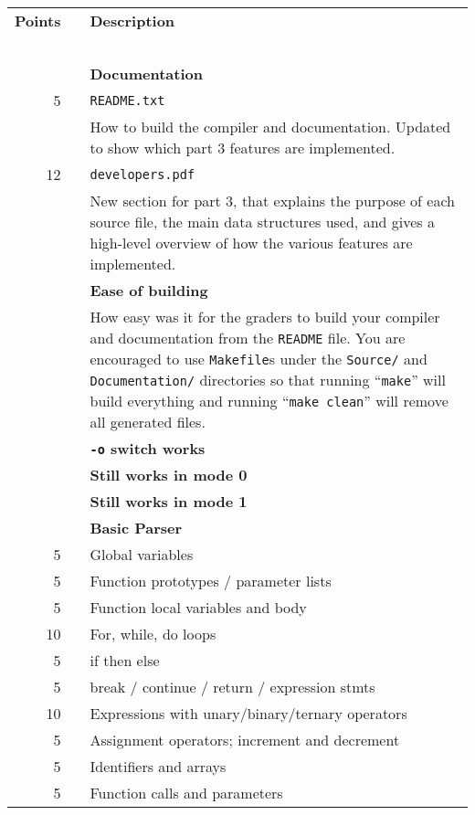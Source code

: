 \documentclass{article}
\makeatletter
\newcommand{\gradeline}{ \cline{1-2} \cline{4-4} ~\\[-1.5ex] }
\newenvironment{gradetable}{\begin{longtable}{@{}rrcp{5in}} \multicolumn{2}{l}{\bf Points} & & {\bf Description}\\ \gradeline}{\end{longtable}}
\newcommand{\mainitem}[2]{\pagebreak[2] {\bf #1} &&& {\bf #2}}
\newcommand{\mainpara}[1]{~ &&& {#1} }
\newcommand{\inneritem}[2]{~ & #1 && #2}
\newcommand{\innerpara}[1]{~ & ~ && #1}
\newcommand{\thispart}{3}
\makeatother
\begin{document}
\noindent
\begin{gradetable}
  \mainitem{17}{Documentation}
  \\[1mm]
  \inneritem{5}{\tt README.txt}
  \\[1mm]
  \innerpara{%
    How to build the compiler and documentation.
    Updated to show which part \thispart{} features are implemented.
  }
  \\[1mm]
  \inneritem{12}{\tt developers.pdf}
  \\[1mm]
  \innerpara{%
    New section for part \thispart{}, that explains
    the purpose of each source file,
    the main data structures used,
    and gives a high-level overview of how the various
    features are implemented.
  }
  \\[4mm]

  \mainitem{8}{Ease of building}
  \\[1mm]
  \mainpara{%
    How easy was it for the graders to build your compiler and
    documentation from the {\tt README} file.
		You are encouraged to use {\tt Makefile}s under the
		{\tt Source/} and {\tt Documentation/}
		directories so that running ``{\tt make}''
		will build everything and running ``{\tt make clean}''
		will remove all generated files.
  }
  \\[4mm]

  \mainitem{5}{{\tt -o} switch works}
  \\[4mm]
  \mainitem{5}{Still works in mode 0}
  \\[4mm]
  \mainitem{5}{Still works in mode 1}
  \\[4mm]

  \mainitem{60}{Basic Parser}
  \\[2mm]
    \inneritem{5}{Global variables}
  \\
    \inneritem{5}{Function prototypes / parameter lists}
  \\
    \inneritem{5}{Function local variables and body}
  \\[2mm]
    \inneritem{10}{For, while, do loops}
  \\
    \inneritem{5}{if then else}
  \\
    \inneritem{5}{break / continue / return / expression stmts}
  \\[2mm]
    \inneritem{10}{Expressions with unary/binary/ternary operators}
  \\
    \inneritem{5}{Assignment operators; increment and decrement}
  \\
    \inneritem{5}{Identifiers and arrays}
  \\
    \inneritem{5}{Function calls and parameters}
  \\[4mm]


\end{gradetable}
\end{document}
